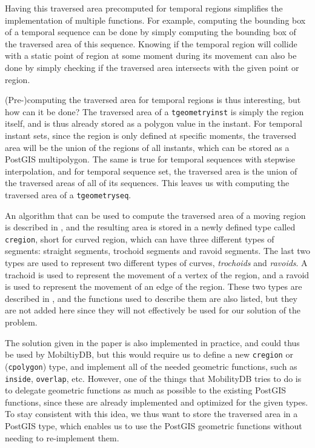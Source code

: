 Having this traversed area precomputed for temporal regions simplifies the implementation of multiple functions. For example, computing the bounding box of a temporal sequence can be done by simply computing the bounding box of the traversed area of this sequence. Knowing if the temporal region will collide with a static point of region at some moment during its movement can also be done by simply checking if the traversed area intersects with the given point or region.

(Pre-)computing the traversed area for temporal regions is thus interesting, but how can it be done? The traversed area of a \lstinline+tgeometryinst+ is simply the region itself, and is thus already stored as a polygon value in the instant. For temporal instant sets, since the region is only defined at specific moments, the traversed area will be the union of the regions of all instants, which can be stored as a PostGIS multipolygon. The same is true for temporal sequences with stepwise interpolation, and for temporal sequence set, the traversed area is the union of the traversed areas of all of its sequences. This leaves us with computing the traversed area of a \lstinline+tgeometryseq+.

An algorithm that can be used to compute the traversed area of a moving region is described in \cite{fmregion}, and the resulting area is stored in a newly defined type called \lstinline{cregion}, short for curved region, which can have three different types of segments: straight segments, trochoid segments and ravoid segments. The last two types are used to represent two different types of curves, \textit{trochoids} and \textit{ravoids}. A trachoid is used to represent the movement of a vertex of the region, and a ravoid is used to represent the movement of an edge of the region. These two types are described in \cite{fmregion}, and the functions used to describe them are also listed, but they are not added here since they will not effectively be used for our solution of the problem.

The solution given in the paper is also implemented in practice, and could thus be used by MobiltiyDB, but this would require us to define a new \lstinline{cregion} or (\lstinline{cpolygon}) type, and implement all of the needed geometric functions, such as \lstinline{inside}, \lstinline{overlap}, etc. However, one of the things that MobilityDB tries to do is to delegate geometric functions as much as possible to the existing PostGIS functions, since these are already implemented and optimized for the given types. To stay consistent with this idea, we thus want to store the traversed area in a PostGIS type, which enables us to use the PostGIS geometric functions without needing to re-implement them.

